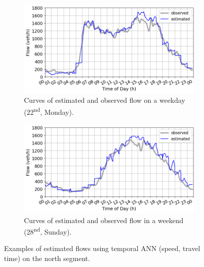 \documentclass[english]{kththesis}
\begin{document}
\begin{figure}[!ht]
    \centering
    \begin{subfigure}{0.75\textwidth}
        \centering
        \includegraphics[width=\textwidth]{daily_estimation_north_weekday.png}
        \caption{Curves of estimated and observed flow on a weekday (22\textsuperscript{nd}, Monday).}
        \label{fig:estimation_weekday_north}
    \end{subfigure}
    \hfill
    \begin{subfigure}{0.75\textwidth}
        \centering
        \includegraphics[width=\textwidth]{daily_estimation_north_weekend.png}
        \caption{Curves of estimated and observed flow in a weekend (28\textsuperscript{nd}, Sunday).}
        \label{fig:estimation_weekend_north}
    \end{subfigure}
    \caption{Examples of estimated flows using temporal ANN (speed, travel time) on the north segment.}
    \label{fig:estimation_week_north}
\end{figure}
\end{document}
